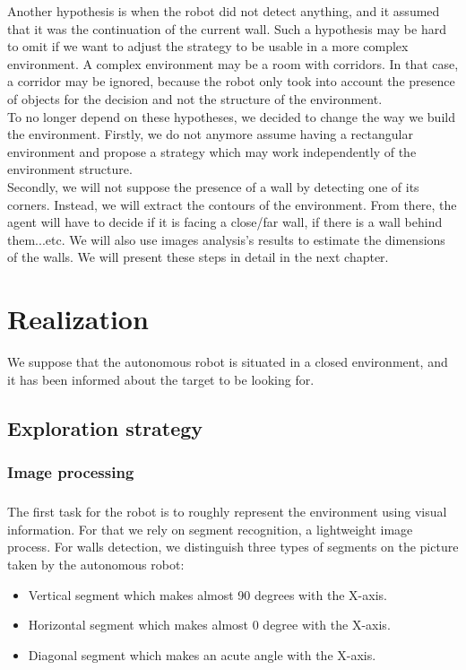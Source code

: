\documentclass[12pt]{report}
\begin{document}
	Another hypothesis is when the robot did not detect anything, and it assumed 
that it was the continuation of the current wall. Such a hypothesis may be hard to omit if we want to adjust the 
strategy to be usable in a more complex environment. A complex environment may be a room with corridors. In that case, a 
corridor may be ignored, because the robot only took into account the presence of objects for the 
decision and not the structure of the environment.\\
	
	To no longer depend on these hypotheses, we decided to change the way we build the environment. Firstly, we do 
not anymore assume having a rectangular environment and propose  a strategy which may work 
independently of the environment structure.\\
Secondly, we will not suppose the 
presence of a wall by detecting one of its corners. Instead, we will extract the contours of the 
environment. From there, the agent will have to decide if it is facing a 
close/far wall, if there is a wall behind them...etc. We will 
also use images analysis's results to estimate the dimensions of the walls. We will present these steps in detail 
in the next chapter.
	
       \chapter{Realization}
    \label{chap:realization}
    
    We suppose that the autonomous robot is situated in a closed environment, and it has been informed about the target to be looking for. 


	\section{Exploration strategy}
	 \subsection{Image processing}
	 \paragraph{}
	 The first task for the robot is to roughly represent the environment using visual 
information. For that we rely on segment recognition, a 
lightweight image process. \cite{s._rahmdel_review_2015} For walls detection, we distinguish three types of segments on the picture taken by the 
autonomous robot:
	 \begin{itemize}
	 	\item Vertical segment which makes almost 90 degrees with the X-axis.
	 	\item Horizontal segment which makes almost 0 degree with the  X-axis.
	 	\item Diagonal segment which makes an acute angle with the X-axis.
	 \end{itemize} 
	 
\end{document}
